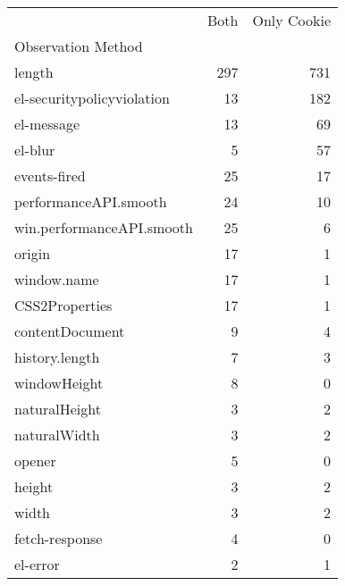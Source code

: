\begin{tabular}{lrr}
 & Both & Only Cookie \\
Observation Method &  &  \\
length & 297 & 731 \\
el-securitypolicyviolation & 13 & 182 \\
el-message & 13 & 69 \\
el-blur & 5 & 57 \\
events-fired & 25 & 17 \\
performanceAPI.smooth & 24 & 10 \\
win.performanceAPI.smooth & 25 & 6 \\
origin & 17 & 1 \\
window.name & 17 & 1 \\
CSS2Properties & 17 & 1 \\
contentDocument & 9 & 4 \\
history.length & 7 & 3 \\
windowHeight & 8 & 0 \\
naturalHeight & 3 & 2 \\
naturalWidth & 3 & 2 \\
opener & 5 & 0 \\
height & 3 & 2 \\
width & 3 & 2 \\
fetch-response & 4 & 0 \\
el-error & 2 & 1 \\
\end{tabular}
